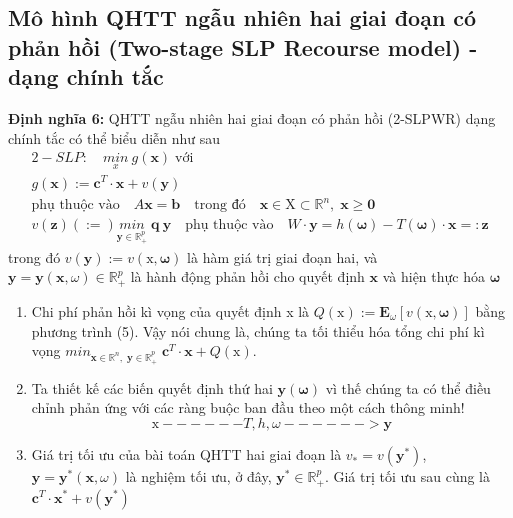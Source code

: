 \documentclass[a4paper]{article}
\begin{document}
	\subsection{Mô hình QHTT ngẫu nhiên hai giai đoạn có phản hồi (Two-stage SLP Recourse model) - dạng chính tắc}
	\textbf{Định nghĩa 6:} QHTT ngẫu nhiên hai giai đoạn có phản hồi (2-SLPWR) dạng chính tắc có thể biểu diễn như sau
    \begin{gather*}
        2-SLP: \quad \underset{x}{min} \: g(\boldsymbol{x}) \; \text{với}\\
        g(\boldsymbol{x}) \mathrel{:=} \boldsymbol{c}^T \cdot \boldsymbol{x} + v(\boldsymbol{y})\\
        \text{phụ thuộc vào} \quad A\boldsymbol{x}=\boldsymbol{b} \quad \text{trong đó} \quad \boldsymbol{x} \in \boldsymbol{\mathrm{X}} \subset \mathbb{R}^n, \; \boldsymbol{x \geq 0} \\
        v(\boldsymbol{z}) \mathrel(:=) \underset{\boldsymbol{y} \in \mathbb{R}_+^p}{min} \; \boldsymbol{q \: y} \quad \text{phụ thuộc vào} \quad
            W \cdot \boldsymbol{y} = h(\boldsymbol{\omega}) - T(\boldsymbol{\omega}) \cdot \boldsymbol{x} \mathrel{=:} \boldsymbol{z} 
    \end{gather*}
    trong đó $v(\boldsymbol{y}) \mathrel{:=} v(\boldsymbol{\mathrm{x}, \omega})$ là hàm giá trị giai đoạn hai, và\\
    $\boldsymbol{y}=\boldsymbol{y}(\boldsymbol{x}, \omega) \in \mathbb{R}_+^p$ là hành động phản hồi cho quyết
        định $\boldsymbol{x}$ và hiện thực hóa $\boldsymbol{\omega}$
    \begin{enumerate}
        \item Chi phí phản hồi kì vọng của quyết định x là $Q(\boldsymbol{\mathrm{x}}) \mathrel{:=} 
        \mathbf{E}_{\omega}[v(\boldsymbol{\mathrm{x}},\boldsymbol{\omega})]$ bằng phương trình (5). Vậy nói chung là,
        chúng ta tối thiểu hóa tổng chi phí kì vọng $min_{\boldsymbol{x} \in \mathbb{R}^n, \; \boldsymbol{y} \in \mathbb{R}_+^p}
            \; \boldsymbol{c}^T \cdot \boldsymbol{x} + Q(\boldsymbol{\mathrm{x}})$.
        \item Ta thiết kế các biến quyết định thứ hai $\boldsymbol{y(\omega)}$ vì thế chúng ta có thể điều chỉnh
            phản ứng với các ràng buộc ban đầu theo một cách thông minh!\\
            \begin{displaymath}
                \boldsymbol{\mathrm{x}}------T, h, \omega ------>\boldsymbol{y}
            \end{displaymath}
        \item Giá trị tối ưu của bài toán QHTT hai giai đoạn là
            $v_*=v(\boldsymbol{y}^*)$,  $\boldsymbol{y} = \boldsymbol{y}^*(\boldsymbol{x}, \omega)$ là nghiệm tối ưu,
            ở đây, $\boldsymbol{y}^* \in \mathbb{R}_+^p$. Giá trị tối ưu sau cùng là
            $\boldsymbol{c}^T \cdot \boldsymbol{x}^* + v(\boldsymbol{y}^*)$
    \end{enumerate}
\end{document}
